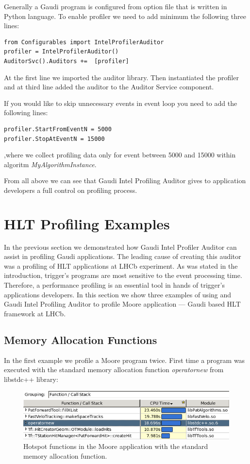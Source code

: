 \documentclass[a4paper]{jpconf}
\begin{document}
Generally a Gaudi program is configured from option file that is written in Python language. 
To enable profiler we need to add minimum the following three lines:
\begin{verbatim}
from Configurables import IntelProfilerAuditor
profiler = IntelProfilerAuditor()
AuditorSvc().Auditors +=  [profiler]
\end{verbatim}

At the first line we imported the auditor library. Then instantiated the profiler and at third line added the auditor 
to the Auditor Service component.

If you would like to skip unnecessary events in event loop you need to add the following lines:
\begin{verbatim}
profiler.StartFromEventN = 5000 
profiler.StopAtEventN = 15000
\end{verbatim}
,where we collect profiling data only for event between 5000 and 15000 within algoritm {\it MyAlgorithmInstance}.


From all above we can see that Gaudi Intel Profiling Auditor gives to application developers a full control on 
profiling process.


\section{HLT Profiling Examples}

In the previous section we demonstrated how Gaudi Intel Profiler Auditor can assist  in profiling Gaudi applications. 
The leading cause of  creating this auditor was a profiling of HLT applications at LHCb experiment. 
As was stated in the introduction, trigger’s programs are most sensitive to the event processing time. 
Therefore, a performance profiling is an essential tool in hands of trigger’s applications developers. 
In this section we show three examples of using \amp and Gaudi Intel Profiling Auditor to profile Moore 
application --- Gaudi based HLT framework at LHCb. 

\subsection{Memory Allocation Functions}

In the first example we profile a Moore program twice. First time a program was executed with the standard memory 
allocation function {\it operatornew} from libstdc++ library: 

\begin{figure}[H]
\begin{minipage}{\textwidth}
\includegraphics[width=\textwidth]{figs/fig10.png}
\caption{\label{fig10}Hotspot functions in the Moore application with the standard memory allocation function.}
\end{minipage}
\end{figure}
\end{document}
